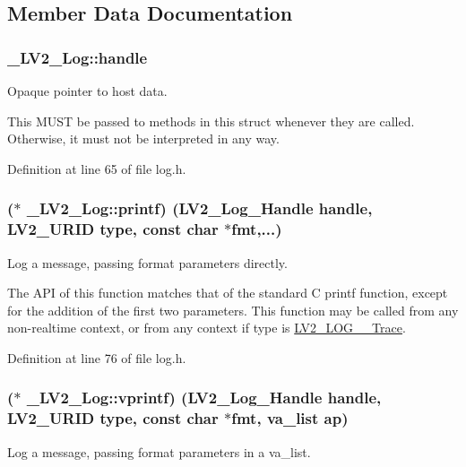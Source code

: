 \subsection{Member Data Documentation}
\subsubsection[{\texorpdfstring{handle}{handle}}]{ \+\_\+\+L\+V2\+\_\+\+Log\+::handle}\hypertarget{struct___l_v2___log_a4c547e1347a0decc4e2101eda1164576}{}\label{struct___l_v2___log_a4c547e1347a0decc4e2101eda1164576}
Opaque pointer to host data.

This M\+U\+ST be passed to methods in this struct whenever they are called. Otherwise, it must not be interpreted in any way. 

Definition at line 65 of file log.\+h.

\subsubsection[{\texorpdfstring{printf}{printf}}]{($\ast$ \+\_\+\+L\+V2\+\_\+\+Log\+::printf) ({\bf L\+V2\+\_\+\+Log\+\_\+\+Handle} {\bf handle}, {\bf L\+V2\+\_\+\+U\+R\+ID} type, {\bf const} char $\ast$fmt,...)}\hypertarget{struct___l_v2___log_a77d41303c80d440153a1dbd42a30d618}{}\label{struct___l_v2___log_a77d41303c80d440153a1dbd42a30d618}
Log a message, passing format parameters directly.

The A\+PI of this function matches that of the standard C printf function, except for the addition of the first two parameters. This function may be called from any non-\/realtime context, or from any context if {\ttfamily type} is \hyperlink{lv2_2lv2_2lv2_2lv2plug_8in_2ns_2ext_2log_2log_8h_aada17d944b0bf4097587300ca6051b16}{L\+V2\+\_\+\+L\+O\+G\+\_\+\+\_\+\+Trace}. 

Definition at line 76 of file log.\+h.

\subsubsection[{\texorpdfstring{vprintf}{vprintf}}]{($\ast$ \+\_\+\+L\+V2\+\_\+\+Log\+::vprintf) ({\bf L\+V2\+\_\+\+Log\+\_\+\+Handle} {\bf handle}, {\bf L\+V2\+\_\+\+U\+R\+ID} type, {\bf const} char $\ast$fmt, va\+\_\+list ap)}\hypertarget{struct___l_v2___log_afdee0feb8249a20100862610dc6eaccd}{}\label{struct___l_v2___log_afdee0feb8249a20100862610dc6eaccd}
Log a message, passing format parameters in a va\+\_\+list.

